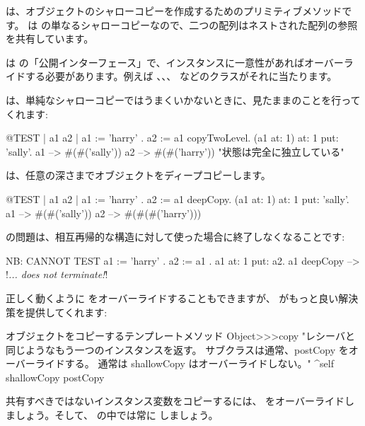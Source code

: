 \documentclass[a4paper,10pt,twoside]{book}
\begin{document}
 は、オブジェクトのシャローコピーを作成するためのプリミティブメソッドです。 は  の単なるシャローコピーなので、二つの配列はネストされた配列の参照を共有しています。%

 は  の「公開インターフェース」で、インスタンスに一意性があればオーバーライドする必要があります。例えば 、、、 などのクラスがそれに当たります。

 は、単純なシャローコピーではうまくいかないときに、見たままのことを行ってくれます:

\begin{code}{@TEST | a1 a2 |}
a1 := { { 'harry' } } .
a2 := a1 copyTwoLevel.
(a1 at: 1) at: 1 put: 'sally'.
a1 --> #(#('sally'))
a2 --> #(#('harry'))    "状態は完全に独立している"
\end{code}

 は、任意の深さまでオブジェクトをディープコピーします。

\begin{code}{@TEST | a1 a2 |}
a1 := { { { 'harry' } } } .
a2 := a1 deepCopy.
(a1 at: 1) at: 1 put: 'sally'.
a1 --> #(#('sally'))
a2 --> #(#(#('harry')))
\end{code}

 の問題は、相互再帰的な構造に対して使った場合に終了しなくなることです:

\begin{code}{NB: CANNOT TEST}
a1 := { 'harry' }.
a2 := { a1 }.
a1 at: 1 put: a2.
a1 deepCopy --> !\emph{... does not terminate!}!
\end{code}%

正しく動くように  をオーバーライドすることもできますが、 がもっと良い解決策を提供してくれます:

\begin{method}{オブジェクトをコピーするテンプレートメソッド}
Object>>>copy
    "レシーバと同じようなもう一つのインスタンスを返す。
    サブクラスは通常、postCopy をオーバーライドする。
    通常は shallowCopy はオーバーライドしない。"
    ^self shallowCopy postCopy
\end{method}

共有すべきではないインスタンス変数をコピーするには、 をオーバーライドしましょう。そして、 の中では常に  しましょう。
\end{document}
